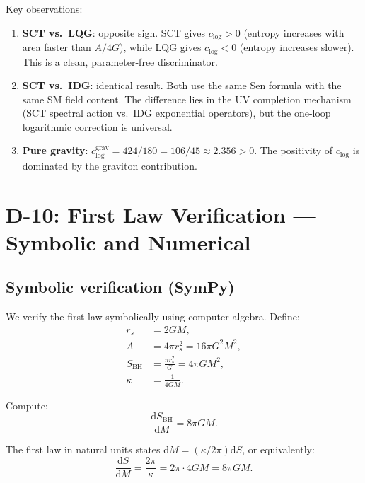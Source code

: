 \documentclass[11pt,a4paper]{article}
\renewcommand{\dd}{\mathrm{d}}
\theoremstyle{plain}
\theoremstyle{definition}
\begin{document}
Key observations:
\begin{enumerate}[nosep]
  \item \textbf{SCT vs.\ LQG}: opposite sign. SCT gives $c_{\log} > 0$
    (entropy increases with area faster than $A/4G$), while LQG gives
    $c_{\log} < 0$ (entropy increases slower). This is a clean,
    parameter-free discriminator.
  \item \textbf{SCT vs.\ IDG}: identical result. Both use the same
    Sen formula with the same SM field content. The difference lies in
    the UV completion mechanism (SCT spectral action vs.\ IDG
    exponential operators), but the one-loop logarithmic correction
    is universal.
  \item \textbf{Pure gravity}: $c_{\log}^{\mathrm{grav}} = 424/180 = 106/45
    \approx 2.356 > 0$. The positivity of $c_{\log}$ is dominated by
    the graviton contribution.
\end{enumerate}


\section{D-10: First Law Verification --- Symbolic and Numerical}
\label{sec:D10}

\subsection{Symbolic verification (SymPy)}

We verify the first law symbolically using computer algebra. Define:
\begin{align}
  r_s &= 2GM, \\
  A &= 4\pi r_s^2 = 16\pi G^2 M^2, \\
  S_{\mathrm{BH}} &= \frac{\pi r_s^2}{G} = 4\pi G M^2, \\
  \kappa &= \frac{1}{4GM}.
\end{align}

Compute:
\begin{equation}
  \frac{\dd S_{\mathrm{BH}}}{\dd M} = 8\pi G M.
\end{equation}

The first law in natural units states $\dd M = (\kappa/2\pi)\dd S$, or equivalently:
\begin{equation}
  \frac{\dd S}{\dd M} = \frac{2\pi}{\kappa} = 2\pi \cdot 4GM = 8\pi GM.
\end{equation}
\end{document}
